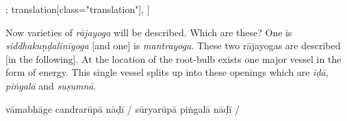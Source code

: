 \documentclass[12pt]{article}%
\def\om{\textrm{\footnotesize \textit{omitted in}\ }} %
\begin{document}
\begin{alignment}[
    texts=edition[class="edition"];
    translation[class="translation"],
  ]
\begin{translation}
    \bigskip
    \begin{tlate}Now varieties of \textit{rājayoga} will be described. Which are these? One is \textit{siddhakuṇḍalinīyoga} [and one] is \textit{mantrayoga}. These two rājayogas are described [in the following]. At the location of the root-bulb exists one major vessel in the form of energy. This single vessel splits up into these openings which are \textit{iḍā}, \textit{piṅgalā} and \textit{suṣumnā}. \end{tlate}
    \end{translation}
    \begin{edition}
      \begin{prose}
        vāmabhāge candrarūpā
        \app{\lem[wit={E,P,L,N1,D1,U1}]{iḍā}
          \rdg[wit={U2}]{\om}} nāḍī
        /
        sūryarūpā piṅgalā nāḍī
        /

\end{prose}
\end{edition}
\end{alignment}
\end{document}
